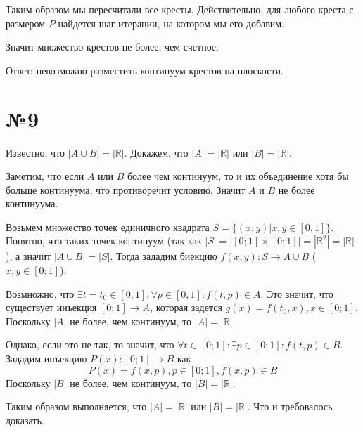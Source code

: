 \documentclass[12pt]{article}
\newcommand{\real}{\mathbb{R}}
\begin{document}
	Таким образом мы пересчитали все кресты. Действительно, для любого креста с размером $P$ найдется шаг итерации, на котором мы его добавим. 
	
	Значит множество крестов не более, чем счетное.
	
	Ответ: невозможно разместить континуум крестов на плоскости.

	\section*{№9}
	
	Известно, что $|A \cup B | =  |\real|$. Докажем, что $|A | = |\real|$ или $|B| = |\real|$.
	
	Заметим, что если $A$ или $B$ более чем континуум, то и их объединение хотя бы больше континуума, что противоречит условию. Значит $A$ и $B$ не более континуума.
	
	Возьмем множество точек единичного квадрата	$S = \{(x, y)|x, y \in [0, 1]\}$. Понятно, что таких точек континуум (так как $|S| = | [0; 1] \times [0; 1] | = |\real^2| = |\real|$), а значит 
	$|A \cup B | = | S|$. Тогда зададим биекцию $f(x, y):S \to A \cup B$ ($x, y \in [0; 1]$).
	
	Возмножно, что $\exists t=t_0 \in [0; 1] : \forall p \in [0, 1]: f(t, p) \in A$. Это значит, 
	что существует инъекция $[0; 1] \to A$, которая задется $g(x) = f(t_0, x), x \in [0; 1]$. Поскольку $|A|$ не более, чем континуум, то $|A| = |\real|$
	
	Однако, если это не так, то значит, что 
	$\forall t \in [0; 1]: \exists p \in [0; 1]: f(t, p) \in B$. Зададим инъекцию $P(x): [0; 1] \to B$ как
	$$P(x) = f(x, p), p \in [0; 1], f(x, p) \in B$$
	Поскольку $|B|$ не более, чем континуум, то $|B | = | \real|$.
	
	Таким образом выполняется, что $|A | = | \real|$ или $|B | = | \real|$. Что и требовалось доказать.
	
\end{document}
